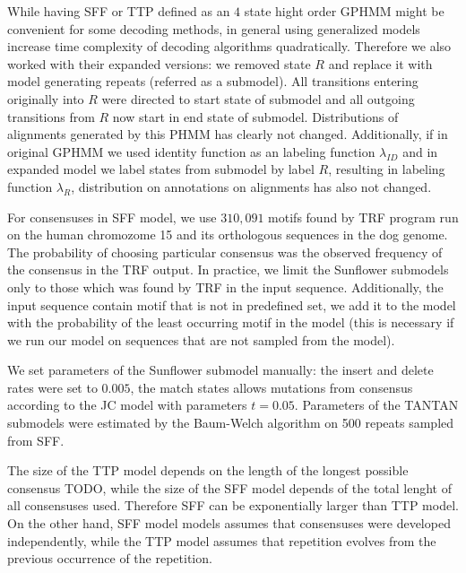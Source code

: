 While having SFF or TTP defined as an $4$ state hight order GPHMM might be
convenient for some decoding methods, in general using generalized models
increase time complexity of decoding algorithms quadratically. Therefore we
also worked with their expanded versions: we removed state $R$ and replace it
with model generating repeats (referred as a submodel). All transitions
entering originally into $R$ were directed to start state of submodel and all
outgoing transitions from $R$ now start in end state of submodel. Distributions
of alignments generated by this PHMM has clearly not changed. Additionally, if
in original GPHMM we used identity function as an labeling function
$\lambda_{ID}$ and in expanded model we label states from submodel by label
$R$, resulting in labeling function $\lambda_R$, distribution on annotations
on alignments has also not changed. 

For consensuses in SFF model, we use $310,091$ motifs found by TRF program run
on the human chromozome 15 and its orthologous sequences in the dog genome. The
probability of choosing particular consensus was the observed frequency of the
consensus in the TRF output. In practice, we limit the Sunflower submodels only
to those which was found by TRF in the input sequence.  Additionally, the input
sequence contain motif that is not in predefined set, we add it to the model
with the probability of the least occurring motif in the model (this is necessary
if we run our model on sequences that are not sampled from the model).

We set parameters of the Sunflower submodel manually: the insert and delete
rates were set to $0.005$, the match states allows mutations from consensus
according to the JC model with parameters $t=0.05$.
Parameters of the TANTAN submodels were estimated by the Baum-Welch algorithm
\cite{Durbin1998} on 500 repeats sampled from SFF.

The size of the TTP model depends on the length of the longest possible
consensus TODO, while the size of the SFF model depends of the total lenght of
all consensuses used. Therefore SFF can be exponentially larger than TTP model.
On the other hand, SFF model models assumes that consensuses were developed
independently, while the TTP model assumes that repetition evolves from the
previous occurrence of the repetition.

